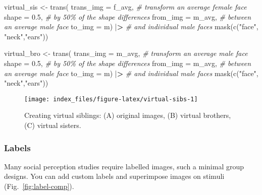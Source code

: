 \documentclass[
  doc,floatsintext]{apa6}
\newenvironment{Shaded}{\begin{snugshade}}{\end{snugshade}}
\newcommand{\AttributeTok}[1]{\textcolor[rgb]{0.77,0.63,0.00}{#1}}
\newcommand{\CommentTok}[1]{\textcolor[rgb]{0.56,0.35,0.01}{\textit{#1}}}
\newcommand{\ErrorTok}[1]{\textcolor[rgb]{0.64,0.00,0.00}{\textbf{#1}}}
\newcommand{\FloatTok}[1]{\textcolor[rgb]{0.00,0.00,0.81}{#1}}
\newcommand{\FunctionTok}[1]{\textcolor[rgb]{0.00,0.00,0.00}{#1}}
\newcommand{\NormalTok}[1]{#1}
\newcommand{\OtherTok}[1]{\textcolor[rgb]{0.56,0.35,0.01}{#1}}
\newcommand{\SpecialCharTok}[1]{\textcolor[rgb]{0.00,0.00,0.00}{#1}}
\newcommand{\StringTok}[1]{\textcolor[rgb]{0.31,0.60,0.02}{#1}}
\begin{document}
\begin{Shaded}
\begin{Highlighting}[]
\NormalTok{virtual\_sis }\OtherTok{\textless{}{-}} \FunctionTok{trans}\NormalTok{(}
  \AttributeTok{trans\_img =}\NormalTok{ f\_avg,   }\CommentTok{\# transform an average female face}
  \AttributeTok{shape =} \FloatTok{0.5}\NormalTok{,         }\CommentTok{\# by 50\% of the shape differences}
  \AttributeTok{from\_img =}\NormalTok{ m\_avg,    }\CommentTok{\# between an average male face}
  \AttributeTok{to\_img =}\NormalTok{ m) }\SpecialCharTok{|}\ErrorTok{\textgreater{}}       \CommentTok{\# and individual male faces}
  \FunctionTok{mask}\NormalTok{(}\FunctionTok{c}\NormalTok{(}\StringTok{"face"}\NormalTok{, }\StringTok{"neck"}\NormalTok{,}\StringTok{"ears"}\NormalTok{)) }

\NormalTok{virtual\_bro }\OtherTok{\textless{}{-}} \FunctionTok{trans}\NormalTok{(}
  \AttributeTok{trans\_img =}\NormalTok{ m\_avg,   }\CommentTok{\# transform an average male face}
  \AttributeTok{shape =} \FloatTok{0.5}\NormalTok{,         }\CommentTok{\# by 50\% of the shape differences}
  \AttributeTok{from\_img =}\NormalTok{ m\_avg,    }\CommentTok{\# between an average male face}
  \AttributeTok{to\_img =}\NormalTok{ m) }\SpecialCharTok{|}\ErrorTok{\textgreater{}}       \CommentTok{\# and individual male faces}
  \FunctionTok{mask}\NormalTok{(}\FunctionTok{c}\NormalTok{(}\StringTok{"face"}\NormalTok{, }\StringTok{"neck"}\NormalTok{,}\StringTok{"ears"}\NormalTok{))}
\end{Highlighting}
\end{Shaded}

\begin{figure}
\texttt{[image: index\_files/figure-latex/virtual-sibs-1]} \caption{Creating virtual siblings: (A) original images, (B) virtual brothers, (C) virtual sisters.}\label{fig:virtual-sibs}
\end{figure}

\hypertarget{labels}{%
\subsubsection{Labels}\label{labels}}

Many social perception studies require labelled images, such a minimal group designs. You can add custom labels and superimpose images on stimuli (Fig.~\ref{fig:label-comp}).
\end{document}

